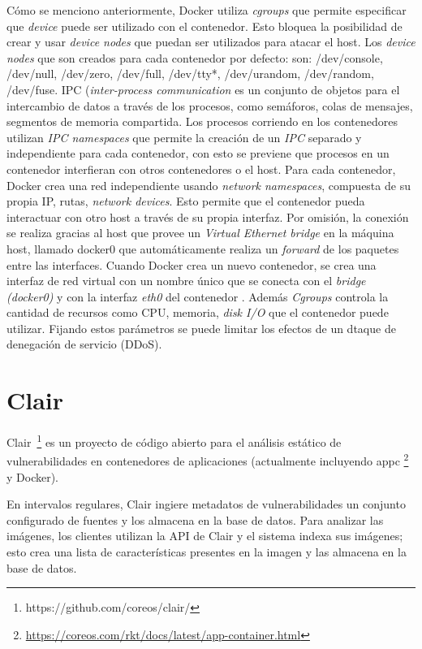 Cómo se menciono anteriormente, Docker utiliza \emph{cgroups} que permite especificar que \emph{device} puede ser utilizado con el contenedor. Esto bloquea la posibilidad de crear y usar \emph{device nodes} que puedan ser utilizados para atacar el host. Los \emph{device nodes} que son creados para cada contenedor por defecto: son: /dev/console, /dev/null, /dev/zero, /dev/full, /dev/tty*, /dev/urandom, /dev/random, /dev/fuse.
IPC (\emph{inter-process communication} es un conjunto de objetos para el intercambio de datos a través de los procesos, como semáforos, colas de mensajes, segmentos de memoria compartida. Los procesos corriendo en los contenedores utilizan \emph{IPC namespaces} que permite la creación de un \emph{IPC} separado y independiente para cada contenedor, con esto se previene que procesos en un contenedor interfieran con otros contenedores o el host.
Para cada contenedor, Docker crea una red independiente usando \emph{network namespaces}, compuesta de su propia IP, rutas, \emph{network devices}. Esto permite que el contenedor pueda interactuar con otro host a través de su propia interfaz.
Por omisión, la conexión se realiza gracias al host que provee un \emph{Virtual Ethernet bridge} en la máquina host, llamado docker0 que automáticamente realiza un \emph{forward} de los paquetes entre las interfaces. Cuando Docker crea un nuevo contenedor, se crea una interfaz de red virtual con un nombre único que se conecta con el \emph{bridge (docker0)} y con la interfaz \emph{eth0} del contenedor \cite{bui2015analysis}.
Además \emph{Cgroups} controla la cantidad de recursos como CPU, memoria, \emph{disk I/O} que el contenedor puede utilizar. 
Fijando estos parámetros se puede limitar los efectos de un dtaque de denegación de servicio (DDoS).

\section{Clair}\label{sec:clair}

Clair~\footnote{https://github.com/coreos/clair/} es un proyecto de código abierto para el análisis estático de vulnerabilidades en contenedores de aplicaciones (actualmente incluyendo appc \footnote{\url{https://coreos.com/rkt/docs/latest/app-container.html}} y Docker).
   
En intervalos regulares, Clair ingiere metadatos de vulnerabilidades un conjunto configurado de fuentes y los almacena en la base de datos. 
Para analizar las imágenes, los clientes utilizan la API de Clair y el sistema indexa sus imágenes; esto crea una lista de características presentes en la imagen y las almacena en la base de datos.

